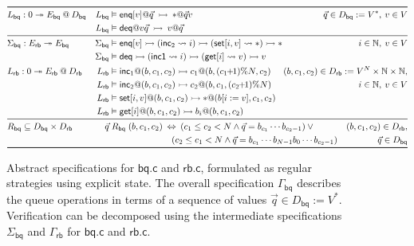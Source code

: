 \documentclass[acmsmall,nonacm]{acmart}
\newcommand{\kw}[1]{\ensuremath{ \mathsf{#1} }}
\newcommand{\emptysig}{0}
\begin{document}
\begin{figure} %
  \small
\begin{align*}
\toprule
&
  L_\kw{bq} : \emptysig \twoheadrightarrow E_\kw{bq} \mathbin@ D_\kw{bq}
&  
  L_\kw{bq} &\vDash
      \kw{enq}[v] @ \vec{q}
      \:\rightarrowtail\:
      {*} @ \vec{q}v
&
  \hspace{-5em}
  \vec{q} \in D_\kw{bq} := V^*, \:
  v \in V
\\ &&
  L_\kw{bq} &\vDash
      \kw{deq} @ v\vec{q}
      \:\rightarrowtail\:
      v @ \vec{q}
\\
\midrule
&
  \Sigma_\kw{bq} : E_\kw{rb} \twoheadrightarrow E_\kw{bq}
&
  \Sigma_\kw{bq} &\vDash
      \kw{enq}[v] \rightarrowtail
      (\kw{inc}_2 \leadsto i) \rightarrowtail
      (\kw{set}[i, v] \leadsto *) \rightarrowtail
      *
&
  i \in \mathbb{N}, \:
  v \in V
\\ &&
    \Sigma_\kw{bq} &\vDash
      \kw{deq} \rightarrowtail
      (\kw{inc1} \leadsto i) \rightarrowtail
      (\kw{get}[i] \leadsto v) \rightarrowtail
      v
\\ &
  L_\kw{rb} : \emptysig \twoheadrightarrow E_\kw{rb} \mathbin@ D_\kw{rb}
&
  L_\kw{rb} &\vDash
    \kw{inc}_1@(b, c_1, c_2) \rightarrowtail
    c_1@(b, (c_1\!\!+\!\!1) \% N, c_2)
&
  \hspace{-8em}
  (b, c_1, c_2) \in D_\kw{rb} :=
    V^N \times \mathbb{N} \times \mathbb{N},
\\ &&
  L_\kw{rb} &\vDash
    \kw{inc}_2 @(b, c_1, c_2) \rightarrowtail
    c_2@(b, c_1, (c_2\!\!+\!\!1) \% N)
&
  i \in \mathbb{N}, \:
  v \in V
\\ &&
  L_\kw{rb} &\vDash
    \kw{set}[i, v]@(b, c_1, c_2) \rightarrowtail
    {*}@(b[i := v], c_1, c_2)
\\ &&
  L_\kw{rb} &\vDash
    \kw{get}[i]@(b, c_1, c_2) \rightarrowtail
    b_i@(b, c_1, c_2)
\\ \midrule &
  R_\kw{bq} \subseteq D_\kw{bq} \times D_\kw{rb}
&
        \vec{q} &\mathrel{R_\kw{bq}} (b, c_1, c_2) \: \Leftrightarrow \:
           (c_1 \le c_2 < N \wedge
            \vec{q} = b_{c_1} \cdots b_{c_2-1}) \vee {}
&
  (b, c_1, c_2) \in D_\kw{rb},
\\ &&
         & \hspace{16.3ex}
           (c_2 \le c_1 < N \wedge
            \vec{q} = b_{c_1} \cdots b_{N-1} b_0 \cdots b_{c_2 - 1})
&
  \vec{q} \in D_\kw{bq}
\\
\bottomrule
\end{align*}
\vspace{-2.5em}
  \caption{Abstract specifications for $\kw{bq.c}$ and $\kw{rb.c}$,
    formulated as regular strategies using explicit state.
    The overall specification $\Gamma_\kw{bq}$
    describes the queue operations in terms of
    a sequence of values $\vec{q} \in D_\kw{bq} := V^*$.
    Verification can be decomposed using the intermediate specifications
    $\Sigma_\kw{bq}$ and $\Gamma_\kw{rb}$ for
    $\kw{bq.c}$ and $\kw{rb.c}$.}
  \label{fig:spec}
\end{figure}
\end{document}
